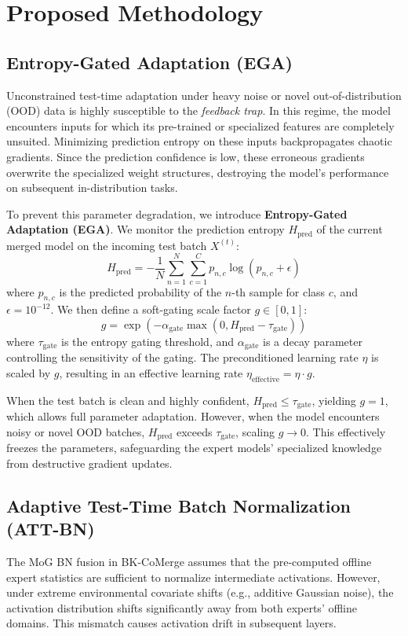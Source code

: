 \documentclass{article}
\theoremstyle{plain}
\theoremstyle{definition}
\theoremstyle{remark}
\begin{document}
\section{Proposed Methodology}
\label{sec:method}

\subsection{Entropy-Gated Adaptation (EGA)}
Unconstrained test-time adaptation under heavy noise or novel out-of-distribution (OOD) data is highly susceptible to the \emph{feedback trap}. In this regime, the model encounters inputs for which its pre-trained or specialized features are completely unsuited. Minimizing prediction entropy on these inputs backpropagates chaotic gradients. Since the prediction confidence is low, these erroneous gradients overwrite the specialized weight structures, destroying the model's performance on subsequent in-distribution tasks.

To prevent this parameter degradation, we introduce \textbf{Entropy-Gated Adaptation (EGA)}. We monitor the prediction entropy $H_{\text{pred}}$ of the current merged model on the incoming test batch $X^{(t)}$:
\begin{equation}
    H_{\text{pred}} = -\frac{1}{N} \sum_{n=1}^N \sum_{c=1}^C p_{n,c} \log(p_{n,c} + \epsilon)
\end{equation}
where $p_{n,c}$ is the predicted probability of the $n$-th sample for class $c$, and $\epsilon = 10^{-12}$. We then define a soft-gating scale factor $g \in [0, 1]$:
\begin{equation}
    g = \exp(-\alpha_{\text{gate}} \max(0, H_{\text{pred}} - \tau_{\text{gate}}))
\end{equation}
where $\tau_{\text{gate}}$ is the entropy gating threshold, and $\alpha_{\text{gate}}$ is a decay parameter controlling the sensitivity of the gating. The preconditioned learning rate $\eta$ is scaled by $g$, resulting in an effective learning rate $\eta_{\text{effective}} = \eta \cdot g$. 

When the test batch is clean and highly confident, $H_{\text{pred}} \le \tau_{\text{gate}}$, yielding $g = 1$, which allows full parameter adaptation. However, when the model encounters noisy or novel OOD batches, $H_{\text{pred}}$ exceeds $\tau_{\text{gate}}$, scaling $g \to 0$. This effectively freezes the parameters, safeguarding the expert models' specialized knowledge from destructive gradient updates.

\subsection{Adaptive Test-Time Batch Normalization (ATT-BN)}
The MoG BN fusion in BK-CoMerge assumes that the pre-computed offline expert statistics are sufficient to normalize intermediate activations. However, under extreme environmental covariate shifts (e.g., additive Gaussian noise), the activation distribution shifts significantly away from both experts' offline domains. This mismatch causes activation drift in subsequent layers.
\end{document}
